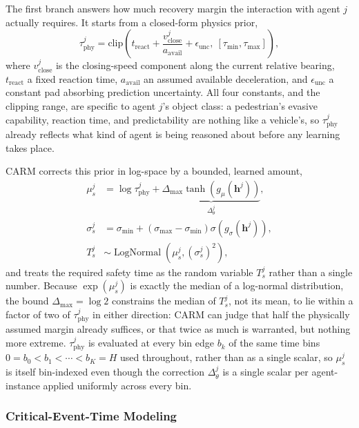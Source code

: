 \documentclass[letterpaper, 10 pt, conference]{ieeeconf}  %
\begin{document}
The first branch answers how much recovery margin the interaction with
agent $j$ actually requires. It starts from a closed-form physics prior,
\begin{equation}
\tau_{\mathrm{phy}}^{j}
=
\mathrm{clip}\!\left(
t_{\mathrm{react}}+\frac{v_{\mathrm{close}}^{j}}{a_{\mathrm{avail}}}+\epsilon_{\mathrm{unc}},
\ [\tau_{\min},\tau_{\max}]
\right),
\label{eq:phy_prior}
\end{equation}
where $v_{\mathrm{close}}^{j}$ is the closing-speed component along the
current relative bearing, $t_{\mathrm{react}}$ a fixed reaction time,
$a_{\mathrm{avail}}$ an assumed available deceleration, and
$\epsilon_{\mathrm{unc}}$ a constant pad absorbing prediction uncertainty.
All four constants, and the clipping range, are specific to agent $j$'s
object class: a pedestrian's evasive capability, reaction time, and
predictability are nothing like a vehicle's, so $\tau_{\mathrm{phy}}^{j}$
already reflects what kind of agent is being reasoned about before any
learning takes place.

CARM corrects this prior in log-space by a bounded, learned amount,
\begin{align}
\mu_s^{j}
&=\log\tau_{\mathrm{phy}}^{j}
+\underbrace{\Delta_{\max}\tanh\!\left(g_{\mu}(\bm h^{j})\right)}_{\Delta_\theta^j},
\nonumber\\
\sigma_s^{j}
&=\sigma_{\min}+(\sigma_{\max}-\sigma_{\min})
\sigma\!\left(g_{\sigma}(\bm h^{j})\right),
\nonumber\\
T_s^{j}&\sim\operatorname{LogNormal}\!\left(\mu_s^{j},(\sigma_s^{j})^2\right),
\label{eq:adaptive_safe_ttc}
\end{align}
and treats the required safety time as the random variable $T_s^{j}$
rather than a single number. Because $\exp(\mu_s^{j})$ is exactly the
median of a log-normal distribution, the bound $\Delta_{\max}=\log 2$
constrains the median of $T_s^{j}$, not its mean, to lie within a factor
of two of $\tau_{\mathrm{phy}}^{j}$ in either direction: CARM can judge
that half the physically assumed margin already suffices, or that twice
as much is warranted, but nothing more extreme. $\tau_{\mathrm{phy}}^{j}$
is evaluated at every bin edge $b_k$ of the same time bins
$0=b_0<b_1<\cdots<b_K=H$ used throughout, rather than as a single scalar,
so $\mu_s^{j}$ is itself bin-indexed even though the correction
$\Delta_\theta^j$ is a single scalar per agent-instance applied uniformly
across every bin.

\subsubsection{Critical-Event-Time Modeling}
\end{document}
